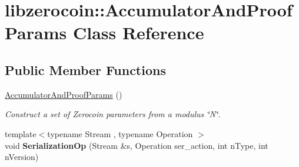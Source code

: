 \hypertarget{classlibzerocoin_1_1_accumulator_and_proof_params}{}\section{libzerocoin\+:\+:Accumulator\+And\+Proof\+Params Class Reference}
\label{classlibzerocoin_1_1_accumulator_and_proof_params}
\subsection*{Public Member Functions}
\begin{DoxyCompactItemize}
\item 
\mbox{\hyperlink{classlibzerocoin_1_1_accumulator_and_proof_params_ad5e69167694e5614940d89f3d1c5fbc5}{Accumulator\+And\+Proof\+Params}} ()
\begin{DoxyCompactList}\small\item\em Construct a set of Zerocoin parameters from a modulus \char`\"{}\+N\char`\"{}. \end{DoxyCompactList}\item 
\mbox{\label{classlibzerocoin_1_1_accumulator_and_proof_params_a1f0f08beef05bc9b972c4b6c8fc83a0c}} 
{\footnotesize template$<$typename Stream , typename Operation $>$ }\\void {\bfseries Serialization\+Op} (Stream \&s, Operation ser\+\_\+action, int n\+Type, int n\+Version)
\end{DoxyCompactItemize}
